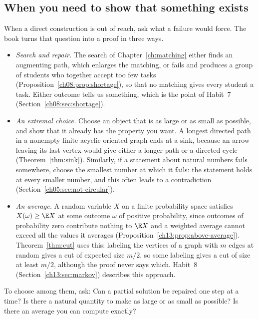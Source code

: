 \subsection*{When you need to show that something exists}
When a direct construction is out of reach, ask what a failure would force. The book turns that question into a proof in three ways.
\begin{itemize}
\item \emph{Search and repair.} The search of Chapter~\ref{ch:matching} either finds an augmenting path, which enlarges the matching, or fails and produces a group of students who together accept too few tasks (Proposition~\ref{ch08:prop:shortage}), so that no matching gives every student a task. Either outcome tells us something, which is the point of Habit~7 (Section~\ref{ch08:sec:shortage}).
\item \emph{An extremal choice.} Choose an object that is as large or as small as possible, and show that it already has the property you want. A longest directed path in a nonempty finite acyclic oriented graph ends at a sink, because an arrow leaving its last vertex would give either a longer path or a directed cycle (Theorem~\ref{thm:sink}). Similarly, if a statement about natural numbers fails somewhere, choose the smallest number at which it fails: the statement holds at every smaller number, and this often leads to a contradiction (Section~\ref{ch05:sec:not-circular}).
\item \emph{An average.} A random variable $X$ on a finite probability space satisfies $X(\omega)\ge\E X$ at some outcome $\omega$ of positive probability, since outcomes of probability zero contribute nothing to $\E X$ and a weighted average cannot exceed all the values it averages (Proposition~\ref{ch13:prop:above-average}). Theorem~\ref{thm:cut} uses this: labeling the vertices of a graph with $m$ edges at random gives a cut of expected size $m/2$, so some labeling gives a cut of size at least $m/2$, although the proof never says which. Habit~8 (Section~\ref{ch13:sec:markov}) describes this approach.
\end{itemize}
To choose among them, ask: Can a partial solution be repaired one step at a time? Is there a natural quantity to make as large or as small as possible? Is there an average you can compute exactly?


